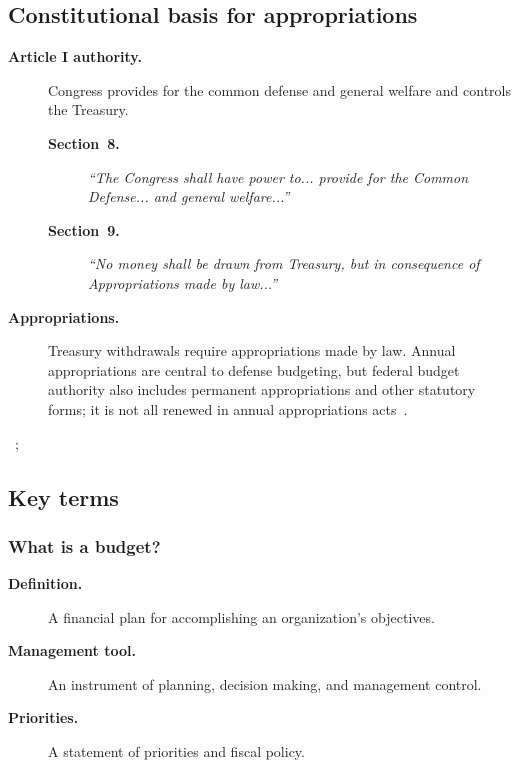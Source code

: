 \documentclass[../main.tex]{subfiles}
\begin{document}
\subsection{Constitutional basis for appropriations}
\begin{description}
  \item[\textbf{Article I authority.}] Congress provides for the common defense and general welfare and controls the Treasury.
        \begin{description}
          \item[\textbf{Section~8.}] \textit{\quote ``The Congress shall have power to... provide for the Common Defense... and general welfare...''}
          \item[\textbf{Section~9.}] \textit{\quote ``No money shall be drawn from Treasury, but in consequence of Appropriations made by law...''}
        \end{description}
  \item[\textbf{Appropriations.}] Treasury withdrawals require appropriations made by law. Annual appropriations are central to defense budgeting, but federal budget authority also includes permanent appropriations and other statutory forms; it is not all renewed in annual appropriations acts~\autocite{GAO-Budget-Glossary-2005}.
\end{description}
~\autocite{US-Constitution-Article-I-2026,CRS-CR}; 

\subsection{Key terms}
\subsubsection{What is a budget?}
\begin{description}
  \item[\textbf{Definition.}] A financial plan for accomplishing an organization's objectives.
  \item[\textbf{Management tool.}] An instrument of planning, decision making, and management control.
  \item[\textbf{Priorities.}] A statement of priorities and fiscal policy.
\end{description}
~
\end{document}
